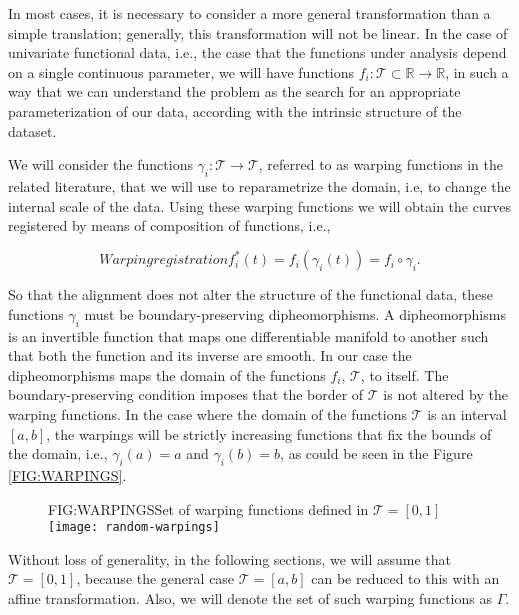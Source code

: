 In most cases, it is necessary to consider a more general transformation than a
simple translation; generally, this transformation will not be linear. In the
case of univariate functional data, i.e., the case that the functions under
analysis
depend on a single continuous parameter, we will have functions
$f_i: \mathcal{T} \subset \mathbb{R} \rightarrow \mathbb{R}$, in such a way that
we can understand
the problem as the search for an appropriate parameterization of our data,
according with the intrinsic structure of the dataset.

We will consider the functions $\gamma_i: \mathcal{T} \rightarrow \mathcal{T}$,
referred to as warping functions in the related literature, that we will use to
reparametrize the domain, i.e, to change the internal scale of the data.
Using these warping functions we will
obtain the curves registered by means of composition of functions, i.e.,

\begin{equation}[]{Warping registration}
f_i^*(t)=f_i(\gamma_i(t)) = f_i \circ \gamma _i.
\end{equation}

So that the alignment does not alter the structure of the functional data,
these functions $\gamma_i$ must be boundary-preserving dipheomorphisms.
A dipheomorphisms is an invertible function that maps one differentiable
manifold to another such that both the function and its inverse are smooth.
In our case the dipheomorphisms maps the domain of the functions $f_i$,
$\mathcal{T}$, to itself. The boundary-preserving condition imposes that the
border of $\mathcal{T}$ is not altered by the warping functions.
In the
case where the domain of the functions $\mathcal{T}$ is an interval $[a,b]$, the
warpings will be strictly increasing functions that fix the bounds of the
domain, i.e., $\gamma_i(a)=a$ and $\gamma_i(b)=b$, as could be seen in the
Figure \ref{FIG:WARPINGS}.

\begin{figure}[Set of warping functions]{FIG:WARPINGS}{Set of warping functions defined in $\mathcal{T}=[0,1]$}
  \texttt{[image: random-warpings]}
\end{figure}

Without loss of generality, in the following sections, we
will assume that $\mathcal{T}=[0,1]$, because the general case
$\mathcal{T}=[a,b]$ can be reduced to this with an affine transformation. Also,
we will denote the set of such warping functions as $\Gamma$.
